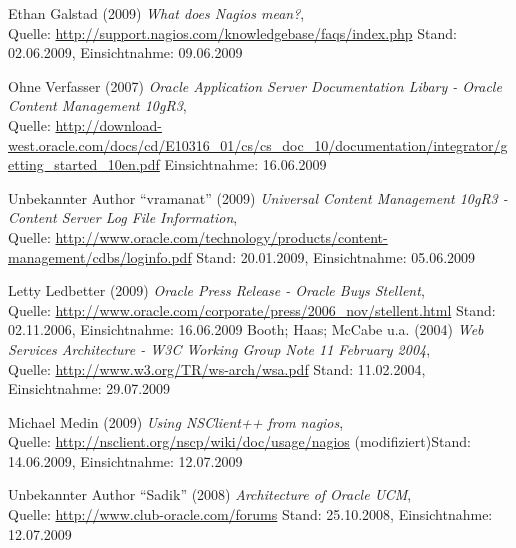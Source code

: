 \documentclass[12pt, a4paper, headsepline]{article}
\newcommand{\pictext}[1]{\glqq\textit{#1}\grqq }
\begin{document}
\begin{thebibliography}{xxxxxxxxxxx}
 		 	 	  Ethan Galstad (2009) \pictext{What does Nagios mean?}, \\ Quelle: \url{http://support.nagios.com/knowledgebase/faqs/index.php} \newline Stand: 02.06.2009, Einsichtnahme: 09.06.2009 	 
	 
	  Ohne Verfasser (2007) \pictext{Oracle Application Server Documentation Libary - Oracle Content Management 10gR3}, \\ Quelle: \url{http://download-west.oracle.com/docs/cd/E10316_01/cs/cs_doc_10/documentation/integrator/getting_started_10en.pdf} \newline Einsichtnahme: 16.06.2009
	 
	 	  Unbekannter Author "`vramanat"' (2009) \pictext{Universal Content Management 10gR3 - Content Server Log File Information}, \\ Quelle: \url{http://www.oracle.com/technology/products/content-management/cdbs/loginfo.pdf} \newline Stand: 20.01.2009, Einsichtnahme: 05.06.2009
	 	 
	 	  Letty Ledbetter (2009) \pictext{Oracle Press Release - Oracle Buys Stellent}, \\ Quelle: \url{http://www.oracle.com/corporate/press/2006_nov/stellent.html} \newline Stand: 02.11.2006, Einsichtnahme: 16.06.2009
		 \newpage 	 
	 	 	  Booth; Haas; McCabe u.a. (2004) \pictext{Web Services Architecture - W3C Working Group Note 11 February 2004}, \\ Quelle: \url{http://www.w3.org/TR/ws-arch/wsa.pdf} \newline Stand: 11.02.2004, Einsichtnahme: 29.07.2009

	   Michael Medin (2009) \pictext{Using NSClient++ from nagios}, \\ Quelle: \url{http://nsclient.org/nscp/wiki/doc/usage/nagios} (modifiziert)\newline Stand: 14.06.2009, Einsichtnahme: 12.07.2009
	 
	 	  Unbekannter Author "`Sadik"' (2008) \pictext{Architecture of Oracle UCM}, \\ Quelle: \url{http://www.club-oracle.com/forums} \newline Stand: 25.10.2008, Einsichtnahme: 12.07.2009
	 	 

\end{thebibliography}

\end{document}
